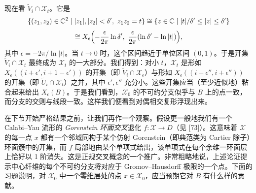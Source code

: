 现在看 $\widetilde{V}_i\cap\mathcal{X}_t$。它是
\[
\{(z_1,z_2)\in\mathbb{C}^2\mid |z_1|,|z_2|<\delta',\ z_1z_2=t\}\cong\{z\in\mathbb{C}\mid |t|/\delta'\le|z|\le\delta'\}
\]
\[
\cong X_\epsilon\Bigl(-\frac{\epsilon}{2\pi}\ln\delta',\ \frac{\epsilon}{2\pi}(\ln\delta'-\ln|t|)\Bigr),
\]
其中 $\epsilon=-2\pi/\ln|t|$。当 $t\to0$ 时，这个区间趋近于单位区间 $(0,1)$。于是开集 $\widetilde{V}_i\cap\mathcal{X}_t$ 最终成为 $\mathcal{X}_t$ 的一大部分。我们得到：对小 $t$，$\mathcal{X}_t$ 是形如 $X_\epsilon((i+\epsilon',i+1-\epsilon'))$ 的开集（即 $\widetilde{V}_i\cap\mathcal{X}_\epsilon$）与形如 $X_\epsilon((i-\epsilon'',i+\epsilon''))$ 的开集（即 $\widetilde{U}_i\cap\mathcal{X}_t$）之并，其中 $\epsilon',\epsilon''$ 充分小。这些开集应当（至少近似地）粘合起来给出
$X_\epsilon(B)$。于是我们看到，$\mathcal{X}_0$ 的不可约分支似乎与 $B$ 上的点一致，而分支的交则与线段一致。这样我们便看到对偶相交复形浮现出来。

在下节开始严格结果之前，让我们再作一个观察。假设更一般地我们有一个 Calabi--Yau 流形的 \emph{Gorenstein 环面交叉}退化 $f:\mathcal{X}\to D$（见 [73]）。这意味着 $\mathcal{X}$ 的每一点 $x$ 都有一个邻域同构于某个仿射 Gorenstein（即典范类为 Cartier 除子）环面簇中的开集，而 $f$ 局部地由某个单项式给出，该单项式在每个余维一环面层上恰好以 1 阶消失。这是正规交叉概念的一个推广。非常粗略地说，上述论证提示中心纤维的每个不可约分支将对应于 Gromov--Hausdorff 极限的一个点。下面的习题说明，对 $\mathcal{X}_0$ 中一个零维层处的点 $x\in\mathcal{X}_0$，应当预期它对 $B$ 有什么样的贡献。

